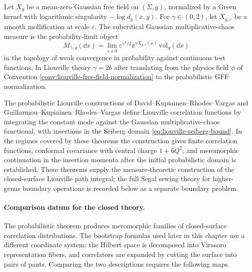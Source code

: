 \begin{definition}
\label{def:liouville-gmc-input}
Let \(X_g\) be a mean-zero Gaussian free field on \((\Sigma,g)\), normalized
by a Green kernel with logarithmic singularity \(-\log d_g(x,y)\).  For
\(\gamma\in(0,2)\), let \(X_{g,\varepsilon}\) be a smooth mollification at
scale \(\varepsilon\).  The subcritical Gaussian multiplicative-chaos measure
is the probability-limit object
\begin{equation}
  M_{\gamma,g}(\dd x)
  =
  \lim_{\varepsilon\downarrow0}
  \varepsilon^{\gamma^2/2}
  \ee^{\gamma X_{g,\varepsilon}(x)}\,\mathrm{vol}_g(\dd x)
  \label{eq:liouville-gmc-measure}
\end{equation}
in the topology of weak convergence in probability against continuous test
functions.  In Liouville theory \(\gamma=2b\) after translating from the
physics field \(\phi\) of Convention
\ref{conv:liouville-free-field-normalization} to the probabilistic GFF
normalization.
\end{definition}

\begin{quotedtheorem}
\label{qthm:gkrv-liouville-correlators}
The probabilistic Liouville constructions of
David--Kupiainen--Rhodes--Vargas and Guillarmou--Kupiainen--Rhodes--Vargas
\cite{DKRV2016,GKRV2024}
define Liouville correlation functions by integrating the constant mode
against the Gaussian multiplicative-chaos functional, with insertions in the
Seiberg domain \eqref{eq:liouville-seiberg-bound}.  In the regimes covered by
these theorems the construction gives finite correlation functions,
conformal covariance with central charge \(1+6Q^2\), and meromorphic
continuation in the insertion momenta after the initial probabilistic domain
is established.  These theorems supply the measure-theoretic construction of
the closed-surface Liouville path integral; the full Segal sewing theory for
higher-genus boundary operations is recorded below as a separate boundary
problem.
\end{quotedtheorem}

\paragraph{Comparison datum for the closed theory.}
The probabilistic theorem produces meromorphic families of closed-surface
correlation distributions.  The bootstrap formulas used later in this
chapter use a different coordinate system: the Hilbert space is decomposed
into Virasoro representation fibers, and correlators are expanded by cutting
the surface into pairs of pants.  Comparing the two descriptions requires the
following maps.

